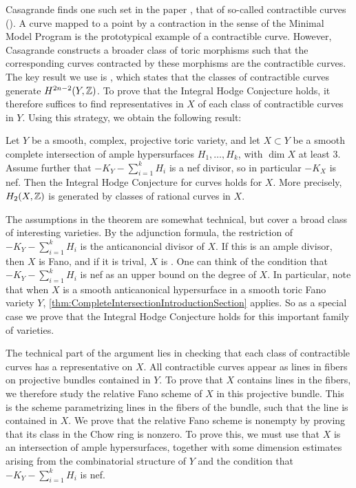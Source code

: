Casagrande finds one such set in the paper \cite{Casagrande}, that of so-called contractible curves (\cite[Definition 2.3]{Casagrande}). A curve mapped to a point by a contraction in the sense of the Minimal Model Program is the prototypical example of a contractible curve. However, Casagrande constructs a broader class of toric morphisms such that the corresponding curves contracted by these morphisms are the contractible curves. The key result we use is \cite[Theorem 4.1]{Casagrande}, which states that the classes of contractible curves generate $H^{2n-2}(Y,\mathbb{Z})$. To prove that the Integral Hodge Conjecture holds, it therefore suffices to find representatives in $X$ of each class of contractible curves in $Y$. Using this strategy, we obtain the following result:
\begin{theorem}
	\label{thm:CompleteIntersectionIntroductionSection}
	Let $Y$ be a smooth, complex, projective toric variety, and let $X \subset Y$ be a smooth complete intersection of ample hypersurfaces $H_1,\dots,H_k$, with $\dim X$ at least $3$. Assume further that $-K_Y - \sum_{i=1}^kH_i$ is a nef divisor, so in particular $-K_X$ is nef. Then the Integral Hodge Conjecture for curves holds for $X$. More precisely, $H_2(X,\mathbb{Z})$ is generated by classes of rational curves in $X$.
\end{theorem}
The assumptions in the theorem are somewhat technical, but cover a broad class of interesting varieties. By the adjunction formula, the restriction of $-K_Y - \sum_{i=1}^kH_i$ is the anticanoncial divisor of $X$. If this is an ample divisor, then $X$ is Fano, and if it is trival, $X$ is \CY.
One can think of the condition that $-K_Y - \sum_{i=1}^kH_i$ is nef as an upper bound on the degree of $X$. In particular, note that when $X$ is a smooth anticanonical hypersurface in a smooth toric Fano variety $Y$, \cref{thm:CompleteIntersectionIntroductionSection} applies. So as a special case we prove that the Integral Hodge Conjecture holds for this important family of \CY varieties.

The technical part of the argument lies in checking that each class of contractible curves has a representative on $X$. All contractible curves appear as lines in fibers on projective bundles contained in $Y$. To prove that $X$ contains lines in the fibers, we therefore study the relative Fano scheme of $X$ in this projective bundle. This is the scheme parametrizing lines in the fibers of the bundle, such that the line is contained in $X$. We prove that the relative Fano scheme is nonempty by proving that its class in the Chow ring is nonzero. To prove this, we must use that $X$ is an intersection of ample hypersurfaces, together with some dimension estimates arising from the combinatorial structure of $Y$ and the condition that $-K_Y - \sum_{i=1}^kH_i$ is nef.

